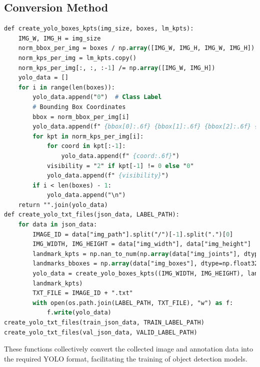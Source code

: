 \subsection{Conversion Method}
\begin{lstlisting}[language=Pascal, caption={YOLO Formatting Fucntions}, label={lst:}, basicstyle=\ttfamily\scriptsize, frame=single]
def create_yolo_boxes_kpts(img_size, boxes, lm_kpts):
    IMG_W, IMG_H = img_size
    norm_bbox_per_img = boxes / np.array([IMG_W, IMG_H, IMG_W, IMG_H])
    norm_kps_per_img = lm_kpts.copy()
    norm_kps_per_img[:, :, :-1] /= np.array([IMG_W, IMG_H])
    yolo_data = []
    for i in range(len(boxes)):
        yolo_data.append("0")  # Class Label
        # Bounding Box Coordinates
        bbox = norm_bbox_per_img[i]
        yolo_data.append(f" {bbox[0]:.6f} {bbox[1]:.6f} {bbox[2]:.6f} {bbox[3]:.6f}")
        for kpt in norm_kps_per_img[i]:
            for coord in kpt[:-1]:
                yolo_data.append(f" {coord:.6f}")
            visibility = "2" if kpt[-1] != 0 else "0"
            yolo_data.append(f" {visibility}")
        if i < len(boxes) - 1:
            yolo_data.append("\n")
    return "".join(yolo_data)
def create_yolo_txt_files(json_data, LABEL_PATH):
    for data in json_data:
        IMAGE_ID = data["img_path"].split("/")[-1].split(".")[0]
        IMG_WIDTH, IMG_HEIGHT = data["img_width"], data["img_height"]
        landmark_kpts = np.nan_to_num(np.array(data["img_joints"], dtype=np.float32))
        landmarks_bboxes = np.array(data["img_boxes"], dtype=np.float32)
        yolo_data = create_yolo_boxes_kpts((IMG_WIDTH, IMG_HEIGHT), landmarks_bboxes,
        landmark_kpts)
        TXT_FILE = IMAGE_ID + ".txt"
        with open(os.path.join(LABEL_PATH, TXT_FILE), "w") as f:
            f.write(yolo_data)
create_yolo_txt_files(train_json_data, TRAIN_LABEL_PATH)
create_yolo_txt_files(val_json_data, VALID_LABEL_PATH)
\end{lstlisting}
These functions collectively convert the collected image and annotation data into the required YOLO format, facilitating the training of object detection models.
\newpage
